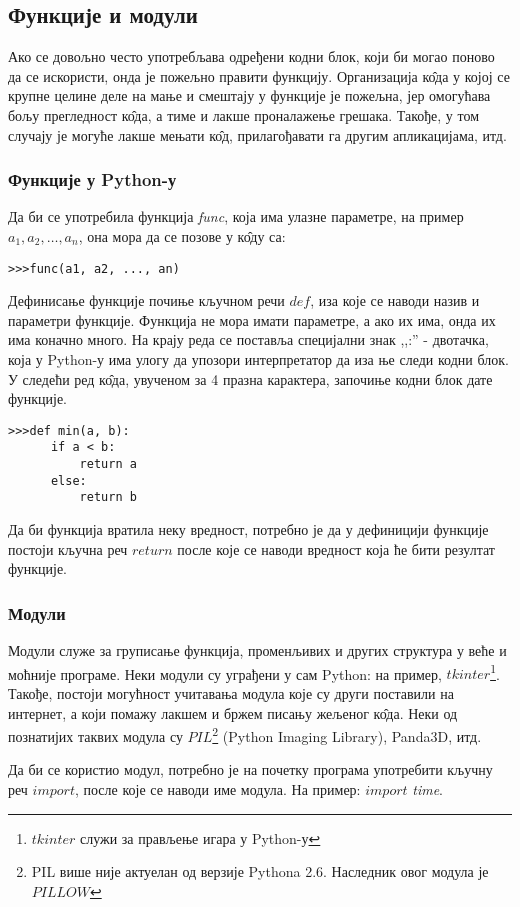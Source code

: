 \subsection{Функције и модули}

Ако се довољно често употребљава одређени кодни блок, који би могао поново да се искористи, онда је пожељно правити функцију. Организација к\^{о}да у којој се крупне целине деле на мање и смештају у функције је пожељна, јер омогућава бољу прегледност к\^{о}да, а тиме и лакше проналажење грешака. Такође, у том случају је могуће лакше мењати к\^{о}д, прилагођавати га другим апликацијама, итд.

\subsubsection{Функције у Python-у}

Да би се употребила функција \emph{func}, која има улазне параметре, на пример $a_{1}, a_{2},\dots, a_{n}$, она мора да се позове у к\^{о}ду са:

\begin{lstlisting}
>>>func(a1, a2, ..., an)
\end{lstlisting}

Дефинисање функције почиње кључном речи $def$, иза које се наводи назив и параметри функције. Функција не мора имати параметре, а ако их има, онда их има коначно много. На крају реда се поставља специјални знак ,,:'' - двотачка, која у Python-у има улогу да упозори интерпретатор да иза ње следи кодни блок. У следећи ред к\^{о}да, увученом за 4 празна карактера, започиње кодни блок дате функције.

\begin{lstlisting}[caption = Дефинисање функције, label = func]
>>>def min(a, b):
      if a < b:
          return a
      else:
          return b
\end{lstlisting}

Да би функција вратила неку вредност, потребно је да у дефиницији функције постоји кључна реч $return$ после које се наводи вредност која ће бити резултат функције.

\subsubsection{Модули}

Модули служе за груписање функција, променљивих и других структура у веће и моћније програме. Неки модули су уграђени у сам Python: на пример, $tkinter$\footnote{$tkinter$ служи за прављење игара у Python-у}. Такође, постоји могућност учитавања модула које су други поставили на интернет, а који помажу лакшем и бржем писању жељеног к\^{о}да. Неки од познатијих таквих модула су $PIL$\footnote{PIL више није актуелан од верзије Pythona 2.6. Наследник овог модула је $PILLOW$}  (Python Imaging Library), Panda3D, итд.

Да би се користио модул, потребно је на почетку програма употребити кључну реч $import$, после које се наводи име модула. На пример: $import$ \emph{time}.
